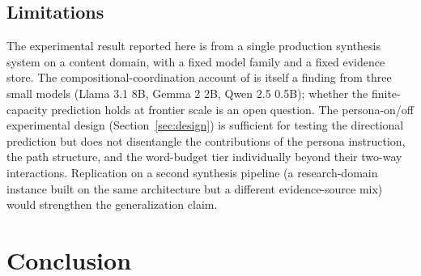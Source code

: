 \documentclass[11pt]{article}
\begin{document}
\subsection{Limitations}

The experimental result reported here is from a single production
synthesis system on a content domain, with a fixed model family and a
fixed evidence store. The compositional-coordination account of
\citet{rocchetti_instructions_2026} is itself a finding from three
small models (Llama 3.1 8B, Gemma 2 2B, Qwen 2.5 0.5B); whether the
finite-capacity prediction holds at frontier scale is an open question.
The persona-on/off experimental design (Section~\ref{sec:design}) is
sufficient for testing the directional prediction but does not
disentangle the contributions of the persona instruction, the path
structure, and the word-budget tier individually beyond their
two-way interactions. Replication on a second synthesis pipeline (a
research-domain instance built on the same architecture but a different
evidence-source mix) would strengthen the generalization claim.


\section{Conclusion}
\label{sec:conclusion}

\nocite{*}



\end{document}
